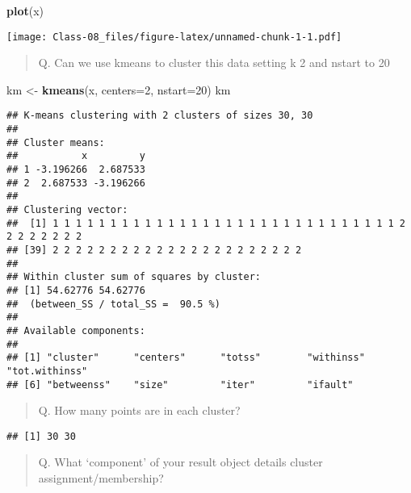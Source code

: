 \documentclass[]{article}
\newenvironment{Shaded}{\begin{snugshade}}{\end{snugshade}}
\newcommand{\DataTypeTok}[1]{\textcolor[rgb]{0.13,0.29,0.53}{#1}}
\newcommand{\DecValTok}[1]{\textcolor[rgb]{0.00,0.00,0.81}{#1}}
\newcommand{\KeywordTok}[1]{\textcolor[rgb]{0.13,0.29,0.53}{\textbf{#1}}}
\newcommand{\NormalTok}[1]{#1}
\newcommand{\OperatorTok}[1]{\textcolor[rgb]{0.81,0.36,0.00}{\textbf{#1}}}
\newcommand{\StringTok}[1]{\textcolor[rgb]{0.31,0.60,0.02}{#1}}
\begin{document}
\begin{Shaded}
\begin{Highlighting}[]
\KeywordTok{plot}\NormalTok{(x)}
\end{Highlighting}
\end{Shaded}

\texttt{[image: Class-08\_files/figure-latex/unnamed-chunk-1-1.pdf]}

\begin{quote}
Q. Can we use kmeans to cluster this data setting k 2 and nstart to 20
\end{quote}

\begin{Shaded}
\begin{Highlighting}[]
\NormalTok{km <-}\StringTok{ }\KeywordTok{kmeans}\NormalTok{(x, }\DataTypeTok{centers=}\DecValTok{2}\NormalTok{, }\DataTypeTok{nstart=}\DecValTok{20}\NormalTok{)}
\NormalTok{km}
\end{Highlighting}
\end{Shaded}

\begin{verbatim}
## K-means clustering with 2 clusters of sizes 30, 30
## 
## Cluster means:
##           x         y
## 1 -3.196266  2.687533
## 2  2.687533 -3.196266
## 
## Clustering vector:
##  [1] 1 1 1 1 1 1 1 1 1 1 1 1 1 1 1 1 1 1 1 1 1 1 1 1 1 1 1 1 1 1 2 2 2 2 2 2 2 2
## [39] 2 2 2 2 2 2 2 2 2 2 2 2 2 2 2 2 2 2 2 2 2 2
## 
## Within cluster sum of squares by cluster:
## [1] 54.62776 54.62776
##  (between_SS / total_SS =  90.5 %)
## 
## Available components:
## 
## [1] "cluster"      "centers"      "totss"        "withinss"     "tot.withinss"
## [6] "betweenss"    "size"         "iter"         "ifault"
\end{verbatim}

\begin{quote}
Q. How many points are in each cluster?
\end{quote}

\begin{Shaded}
\end{Shaded}

\begin{verbatim}
## [1] 30 30
\end{verbatim}

\begin{quote}
Q. What `component' of your result object details cluster
assignment/membership?
\end{quote}
\end{document}
